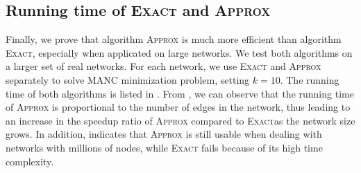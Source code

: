 \documentclass[sigconf]{acmart}
\begin{document}

\subsection{Running time of \textsc{Exact} and \textsc{Approx}}

Finally, we prove that algorithm \textsc{Approx} is much more efficient than algorithm \textsc{Exact}, especially when applicated on large networks.
We test both algorithms on a larger set of real networks.
For each network, we use \textsc{Exact} and \textsc{Approx} separately to solve MANC minimization problem, setting \(k=10\).
The running time of both algorithms is listed in .
From , we can observe that the running time of \textsc{Approx} is proportional to the number of edges in the network, thus leading to an increase in the speedup ratio of \textsc{Approx} compared to \textsc{Exact}as the network size grows.
In addition,  indicates that \textsc{Approx} is still usable when dealing with networks with millions of nodes, while \textsc{Exact} fails because of its high time complexity.
\end{document}
